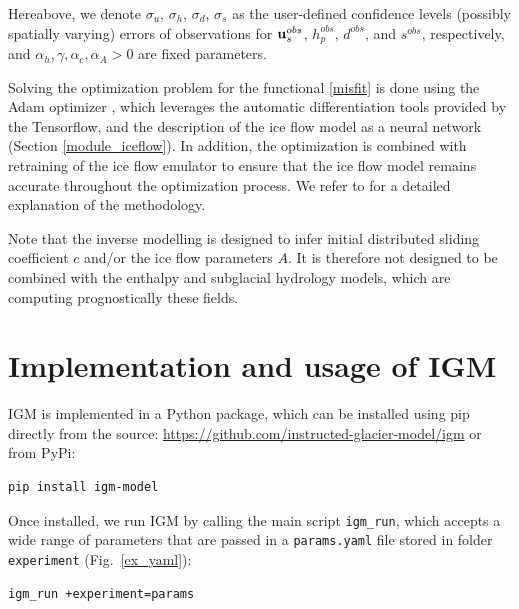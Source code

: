 \documentclass[gmd]{copernicus}
\begin{document}
Hereabove, we denote $\sigma_u$, $\sigma_h$, $\sigma_d$, $\sigma_s$ as the user-defined confidence levels (possibly spatially varying) errors of observations for ${\bf u}_s^{obs}$, $h_p^{obs}$, $d^{obs}$, and $s^{obs}$, respectively, and $\alpha_h, \gamma, \alpha_c, \alpha_A>0$ are fixed parameters.

Solving the optimization problem for the functional \eqref{misfit} is done using the Adam optimizer \citep{kingma2014adam}, which  leverages the automatic differentiation tools provided by the Tensorflow, and the description of the ice flow model as a neural network (Section \ref{module_iceflow}). In addition, the optimization is combined with retraining of the ice flow emulator to ensure that the ice flow model remains accurate throughout the optimization process. We refer to \citet{jouvet2023ice} for a detailed explanation of the methodology.
 
Note that the inverse modelling is designed to infer initial distributed sliding coefficient $c$ and/or the ice flow parameters $A$. It is therefore not designed to be combined with the enthalpy and subglacial hydrology models, which are computing prognostically these fields.
 
\section{Implementation and usage of IGM}

IGM is implemented in a Python package, which can be installed using pip directly from the source: \url{https://github.com/instructed-glacier-model/igm} or from PyPi:
\begin{lstlisting}[language=bash,frame=single,numbers=none]
pip install igm-model
\end{lstlisting}

Once installed, we run IGM by calling the main script \texttt{igm\_run}, which accepts a wide range of parameters that are passed in a \texttt{params.yaml} file stored in folder \texttt{experiment} (Fig.~\ref{ex_yaml}):
\begin{lstlisting}[language=bash,frame=single,numbers=none]
igm_run +experiment=params
\end{lstlisting} 
\end{document}
